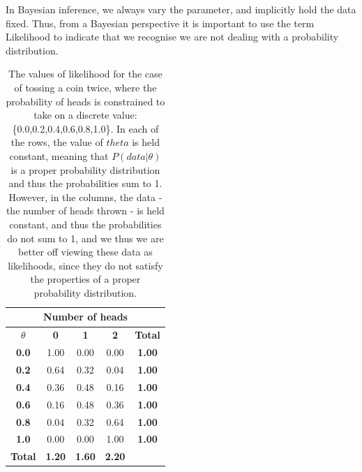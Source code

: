 \documentclass[11pt,fullpage]{book}
\begin{document}
In Bayesian inference, we always vary the parameter, and implicitly hold the data fixed. Thus, from a Bayesian perspective it is important to use the term Likelihood to indicate that we recognise we are not dealing with a probability distribution.


\begin{table}[htbp]
  \centering
  
    \begin{tabular}{ccccc}
    \multicolumn{5}{c}{\textbf{Number of heads}} \\
    \midrule
    \textbf{$\theta$} & \multicolumn{1}{c}{\textbf{0}} & \multicolumn{1}{c}{\textbf{1}} & \multicolumn{1}{c}{\textbf{2}} &  \multicolumn{1}{c}{\textbf{Total}} \\
    \hline
    \textbf{0.0} & \multicolumn{1}{c}{1.00} & \multicolumn{1}{c}{0.00} & \multicolumn{1}{c}{0.00} & \multicolumn{1}{c}{\textbf{1.00}} \\
    \textbf{0.2} & \multicolumn{1}{c}{0.64} & \multicolumn{1}{c}{0.32} & \multicolumn{1}{c}{0.04} & \multicolumn{1}{c}{\textbf{1.00}} \\
    \textbf{0.4} & \multicolumn{1}{c}{0.36} & \multicolumn{1}{c}{0.48} & \multicolumn{1}{c}{0.16} & \multicolumn{1}{c}{\textbf{1.00}} \\
    \textbf{0.6} & \multicolumn{1}{c}{0.16} & \multicolumn{1}{c}{0.48} & \multicolumn{1}{c}{0.36} & \multicolumn{1}{c}{\textbf{1.00}} \\
    \textbf{0.8} & \multicolumn{1}{c}{0.04} & \multicolumn{1}{c}{0.32} & \multicolumn{1}{c}{0.64} & \multicolumn{1}{c}{\textbf{1.00}} \\
    \textbf{1.0} & \multicolumn{1}{c}{0.00} & \multicolumn{1}{c}{0.00} & \multicolumn{1}{c}{1.00} & \multicolumn{1}{c}{\textbf{1.00}} \\
    \bottomrule
    \textbf{Total} & \multicolumn{1}{c}{\textbf{1.20}} & \multicolumn{1}{c}{\textbf{1.60}} & \multicolumn{1}{c}{\textbf{2.20}} &  \\
    
    \end{tabular}%
  \caption{The values of likelihood for the case of tossing a coin twice, where the probability of heads is constrained to take on a discrete value: \{0.0,0.2,0.4,0.6,0.8,1.0\}. In each of the rows, the value of $theta$ is held constant, meaning that $P(data|\theta)$ is a proper probability distribution and thus the probabilities sum to 1. However, in the columns, the data - the number of heads thrown - is held constant, and thus the probabilities do not sum to 1, and we thus we are better off viewing these data as likelihoods, since they do not satisfy the properties of a proper probability distribution.}\label{tab:Likeihood_BayesBox}
\end{table}
\end{document}
